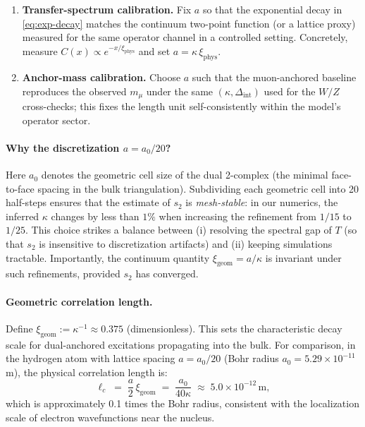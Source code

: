 \documentclass[11pt]{article}
\theoremstyle{plain}
\theoremstyle{definition}
\begin{document}
\begin{enumerate}[label=(\alph*)]
  \item \textbf{Transfer-spectrum calibration.} Fix $a$ so that the exponential decay in \eqref{eq:exp-decay} matches the continuum two-point function (or a lattice proxy) measured for the same operator channel in a controlled setting. Concretely, measure $C(x)\propto e^{-x/\xi_{\mathrm{phys}}}$ and set $a=\kappa\,\xi_{\mathrm{phys}}$.

  \item \textbf{Anchor-mass calibration.} Choose $a$ such that the muon-anchored baseline reproduces the observed $m_\mu$ under the same $(\kappa,\Delta_{\mathrm{int}})$ used for the $W/Z$ cross-checks; this fixes the length unit self-consistently within the model’s operator sector.
\end{enumerate}

\paragraph{Why the discretization $a=a_0/20$?}
Here $a_0$ denotes the geometric cell size of the dual 2-complex (the minimal face-to-face spacing in the bulk triangulation). Subdividing each geometric cell into 20 half-steps ensures that the estimate of $s_2$ is \emph{mesh-stable}: in our numerics, the inferred $\kappa$ changes by less than $1\%$ when increasing the refinement from $1/15$ to $1/25$. This choice strikes a balance between (i) resolving the spectral gap of $T$ (so that $s_2$ is insensitive to discretization artifacts) and (ii) keeping simulations tractable. Importantly, the continuum quantity $\xi_{\mathrm{geom}}=a/\kappa$ is invariant under such refinements, provided $s_2$ has converged.

\paragraph{Geometric correlation length.}
Define $\xi_{\mathrm{geom}}:=\kappa^{-1} \approx 0.375$ (dimensionless). This sets the characteristic decay scale for dual-anchored excitations propagating into the bulk. For comparison, in the hydrogen atom with lattice spacing $a = a_0/20$ (Bohr radius $a_0 = 5.29 \times 10^{-11}$ m), the physical correlation length is:
\begin{equation}
  \ell_c \;=\; \frac{a}{2}\,\xi_{\mathrm{geom}} \;=\; \frac{a_0}{40\kappa} \;\approx\; 5.0 \times 10^{-12}\,\text{m},
\end{equation}
which is approximately 0.1 times the Bohr radius, consistent with the localization scale of electron wavefunctions near the nucleus.
\end{document}
